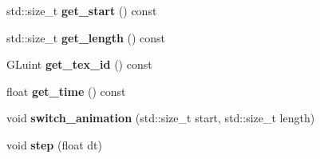 \begin{DoxyCompactItemize}
\item 
\mbox{\label{classnta_1_1Animation2D_a27647ebb0767d114b3330d784be76659}} 
std\+::size\+\_\+t {\bfseries get\+\_\+start} () const
\item 
\mbox{\label{classnta_1_1Animation2D_a879e528e64c38508ecab2dfff935d5d9}} 
std\+::size\+\_\+t {\bfseries get\+\_\+length} () const
\item 
\mbox{\label{classnta_1_1Animation2D_a0ad6c0188e2b36f42caf1817537ec483}} 
G\+Luint {\bfseries get\+\_\+tex\+\_\+id} () const
\item 
\mbox{\label{classnta_1_1Animation2D_aa0aae6f2c69f9edb1e5f0dc35a440e48}} 
float {\bfseries get\+\_\+time} () const
\item 
\mbox{\label{classnta_1_1Animation2D_a06f041ee6aa98d79af06696095a5e95e}} 
void {\bfseries switch\+\_\+animation} (std\+::size\+\_\+t start, std\+::size\+\_\+t length)
\item 
\mbox{\label{classnta_1_1Animation2D_a3bc6f94232a04f3302ab5670ab46be44}} 
void {\bfseries step} (float dt)
\end{DoxyCompactItemize}
